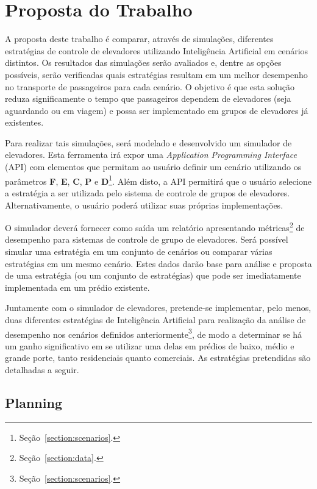 \chapter{\label{chap:proposal}Proposta do Trabalho}

A proposta deste trabalho é comparar, através de simulações, diferentes
estratégias de controle de elevadores utilizando Inteligência Artificial em
cenários distintos. Os resultados das simulações serão avaliados e, dentre as
opções possíveis, serão verificadas quais estratégias resultam em um melhor
desempenho no transporte de passageiros para cada cenário. O objetivo é que esta
solução reduza significamente o tempo que passageiros dependem de elevadores
(seja aguardando ou em viagem) e possa ser implementado em grupos de elevadores
já existentes.

Para realizar tais simulações, será modelado e desenvolvido um simulador de
elevadores. Esta ferramenta irá expor uma \textit{Application Programming
Interface} (API) com elementos que permitam ao usuário definir um cenário
utilizando os parâmetros \textbf{F}, \textbf{E}, \textbf{C}, \textbf{P} e
\textbf{D}\footnote{Seção~\ref{section:scenarios}.}. Além disto, a
API permitirá que o usuário selecione a estratégia a ser utilizada pelo sistema
de controle de grupos de elevadores. Alternativamente, o usuário poderá utilizar
suas próprias implementações.

O simulador deverá fornecer como saída um relatório apresentando
métricas\footnote{Seção~\ref{section:data}.} de desempenho para sistemas de
controle de grupo de elevadores. Será possível simular uma estratégia em um
conjunto de cenários ou comparar várias estratégias em um mesmo cenário. Estes
dados darão base para análise e proposta de uma estratégia (ou um conjunto de
estratégias) que pode ser imediatamente implementada em um prédio existente.

Juntamente com o simulador de elevadores, pretende-se implementar, pelo menos,
duas diferentes estratégias de Inteligência Artificial para realização da
análise de desempenho nos cenários definidos
anteriormente\footnote{Seção~\ref{section:scenarios}.}, de modo a determinar se
há um ganho significativo em se utilizar uma delas em prédios de baixo, médio e
grande porte, tanto residenciais quanto comerciais. As estratégias pretendidas
são detalhadas a seguir.

\section{\label{sec:proposal:planning}Planning}

